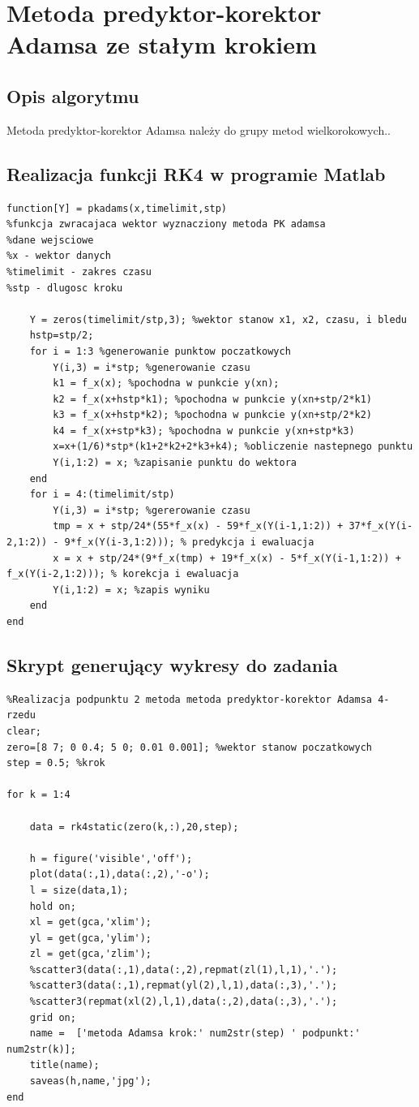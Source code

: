 \documentclass[a4paper, 11pt]{article}
\begin{document}
\section{Metoda predyktor-korektor Adamsa ze stałym krokiem}
\subsection{Opis algorytmu}
Metoda predyktor-korektor Adamsa należy do grupy metod wielkorokowych..

\subsection{Realizacja funkcji RK4 w programie Matlab}
\begin{lstlisting}
function[Y] = pkadams(x,timelimit,stp)
%funkcja zwracajaca wektor wyznacziony metoda PK adamsa 
%dane wejsciowe
%x - wektor danych 
%timelimit - zakres czasu
%stp - dlugosc kroku
   
    Y = zeros(timelimit/stp,3); %wektor stanow x1, x2, czasu, i bledu
    hstp=stp/2;
    for i = 1:3 %generowanie punktow poczatkowych
        Y(i,3) = i*stp; %generowanie czasu
        k1 = f_x(x); %pochodna w punkcie y(xn);
        k2 = f_x(x+hstp*k1); %pochodna w punkcie y(xn+stp/2*k1) 
        k3 = f_x(x+hstp*k2); %pochodna w punkcie y(xn+stp/2*k2)
        k4 = f_x(x+stp*k3); %pochodna w punkcie y(xn+stp*k3)
        x=x+(1/6)*stp*(k1+2*k2+2*k3+k4); %obliczenie nastepnego punktu
        Y(i,1:2) = x; %zapisanie punktu do wektora
    end
    for i = 4:(timelimit/stp)
        Y(i,3) = i*stp; %gererowanie czasu
        tmp = x + stp/24*(55*f_x(x) - 59*f_x(Y(i-1,1:2)) + 37*f_x(Y(i-2,1:2)) - 9*f_x(Y(i-3,1:2))); % predykcja i ewaluacja
        x = x + stp/24*(9*f_x(tmp) + 19*f_x(x) - 5*f_x(Y(i-1,1:2)) + f_x(Y(i-2,1:2))); % korekcja i ewaluacja
        Y(i,1:2) = x; %zapis wyniku
    end
end
\end{lstlisting}


\subsection{Skrypt generujący wykresy do zadania}
\begin{lstlisting}
%Realizacja podpunktu 2 metoda metoda predyktor-korektor Adamsa 4-rzedu
clear; 
zero=[8 7; 0 0.4; 5 0; 0.01 0.001]; %wektor stanow poczatkowych
step = 0.5; %krok

for k = 1:4
    
    data = rk4static(zero(k,:),20,step);
    
    h = figure('visible','off');
    plot(data(:,1),data(:,2),'-o');
    l = size(data,1);
    hold on;
    xl = get(gca,'xlim');
    yl = get(gca,'ylim');
    zl = get(gca,'zlim');
    %scatter3(data(:,1),data(:,2),repmat(zl(1),l,1),'.');
    %scatter3(data(:,1),repmat(yl(2),l,1),data(:,3),'.');
    %scatter3(repmat(xl(2),l,1),data(:,2),data(:,3),'.');
    grid on; 
    name =  ['metoda Adamsa krok:' num2str(step) ' podpunkt:' num2str(k)];
    title(name);
    saveas(h,name,'jpg'); 
end
\end{lstlisting}
\end{document}
